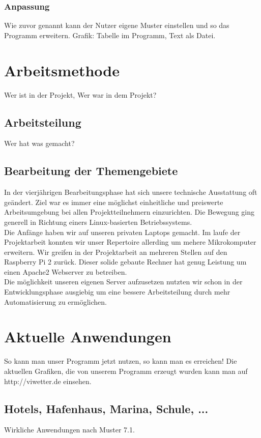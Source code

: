 \documentclass[a4paper,oneside,10pt,titlepage]{article}
\begin{document}
\subsubsection{Anpassung}
Wie zuvor genannt kann der Nutzer eigene Muster einstellen und so das Programm erweitern.
Grafik: Tabelle im Programm, Text als Datei.
\section{Arbeitsmethode}
Wer ist in der Projekt, Wer war in dem Projekt?
\subsection{Arbeitsteilung}
Wer hat was gemacht?
\subsection{Bearbeitung der Themengebiete}
In der vierjährigen Bearbeitungsphase hat sich unsere technische Ausstattung oft geändert. Ziel war es immer eine möglichst einheitliche und preiswerte Arbeitsumgebung bei allen Projektteilnehmern einzurichten. Die Bewegung ging generell in Richtung einers Linux-basierten Betriebssystems.\\
Die Anfänge haben wir auf unseren privaten Laptops gemacht. Im laufe der Projektarbeit konnten wir unser Repertoire allerding um mehere Mikrokomputer erweitern. Wir greifen in der Projektarbeit an mehreren Stellen auf den Raspberry Pi 2 zurück. Dieser solide gebaute Rechner hat genug Leistung um einen Apache2 Webserver zu betreiben.\\
Die möglichkeit unseren eigenen Server aufzusetzen nutzten wir schon in der Entwicklungsphase ausgiebig um eine bessere Arbeitsteilung durch mehr Automatisierung zu ermöglichen.\\
\section{Aktuelle Anwendungen}
So kann man unser Programm jetzt nutzen, so kann man es erreichen!
Die aktuellen Grafiken, die von unserem Programm erzeugt wurden kann man auf http://viwetter.de einsehen.
\subsection{Hotels, Hafenhaus, Marina, Schule, ...}
Wirkliche Anwendungen nach Muster 7.1.
\end{document}
